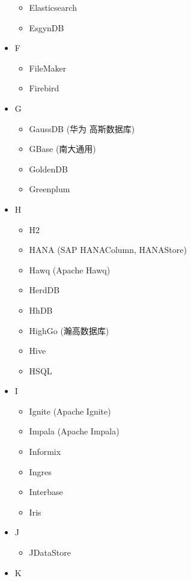 \documentclass[
]{book}
\providecommand{\tightlist}{%
  \setlength{\itemsep}{0pt}\setlength{\parskip}{0pt}}
\begin{document}
\begin{itemize}
  \begin{itemize}
  \tightlist
  \item
    Elasticsearch
  \item
    EsgynDB
  \end{itemize}
\item
  F

  \begin{itemize}
  \tightlist
  \item
    FileMaker
  \item
    Firebird
  \end{itemize}
\item
  G

  \begin{itemize}
  \tightlist
  \item
    GaussDB (华为 高斯数据库)
  \item
    GBase (南大通用)
  \item
    GoldenDB
  \item
    Greenplum
  \end{itemize}
\item
  H

  \begin{itemize}
  \tightlist
  \item
    H2
  \item
    HANA (SAP HANAColumn, HANAStore)
  \item
    Hawq (Apache Hawq)
  \item
    HerdDB
  \item
    HhDB
  \item
    HighGo (瀚高数据库)
  \item
    Hive
  \item
    HSQL\\
  \end{itemize}
\item
  I

  \begin{itemize}
  \tightlist
  \item
    Ignite (Apache Ignite)
  \item
    Impala (Apache Impala)
  \item
    Informix
  \item
    Ingres
  \item
    Interbase
  \item
    Iris
  \end{itemize}
\item
  J

  \begin{itemize}
  \tightlist
  \item
    JDataStore
  \end{itemize}
\item
  K


\end{itemize}
\end{document}
